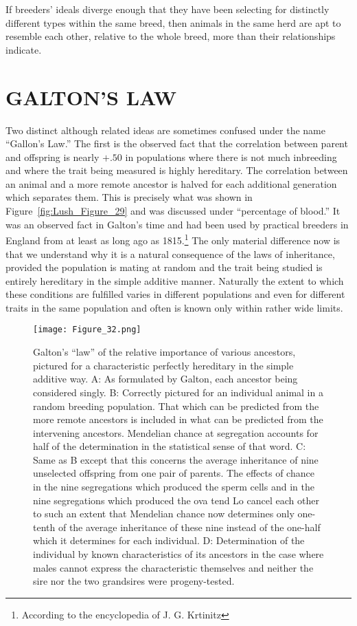 {If breeders' ideals diverge enough that they have been selecting for
distinctly different types within the same breed, then animals in the
same herd are apt to resemble each other, relative to the whole breed,
more than their relationships indicate.
\noclub[3]

\section*{GALTON'S LAW}

Two distinct although related ideas are sometimes confused under
the name ``Gallon's Law.'' The first is the observed fact that the correlation
between parent and offspring is nearly $+ .50$ in populations
where there is not much inbreeding and where the trait being measured
is highly hereditary. The correlation between an animal and a more
remote ancestor is halved for each additional generation which separates
them. This is precisely what was shown in Figure~\ref{fig:Lush_Figure_29} and was
discussed under ``percentage of blood.'' It was an observed fact in Galton's
time and had been used by practical breeders in England from at least
as long ago as 1815.\footnote{According to the encyclopedia of J. G. Krtinitz}
The only material difference now is that we understand
why it is a natural consequence of the laws of inheritance, provided
the population is mating at random and the trait being studied is
entirely hereditary in the simple additive manner. Naturally the extent
to which these conditions are fulfilled varies in different populations
and even for different traits in the same population and often is known
only within rather wide limits.

\begin{figure}[!htbp]
	\centering
    \texttt{[image: Figure\_32.png]}
    \caption{Galton's ``law'' of the relative importance of various ancestors, pictured
			 for a characteristic perfectly hereditary in the simple additive way. A: As formulated
			 by Galton, each ancestor being considered singly. B: Correctly pictured for an individual
			 animal in a random breeding population. That which can be predicted from
			 the more remote ancestors is included in what can be predicted from the intervening
			 ancestors. Mendelian chance at segregation accounts for half of the determination in
			 the statistical sense of that word. C: Same as B except that this concerns the average
			 inheritance of nine unselected offspring from one pair of parents. The effects of
			 chance in the nine segregations which produced the sperm cells and in the nine 
			 segregations which produced the ova tend Lo cancel each other to such an extent that
			 Mendelian chance now determines only one-tenth of the average inheritance of these
			 nine instead of the one-half which it determines for each individual. D: Determination
			 of the individual by known characteristics of its ancestors in the case where
			 males cannot express the characteristic themselves and neither the sire nor the two
			 grandsires were progeny-tested.}
    \label{fig:Lush_Figure_32}
\end{figure}

}
